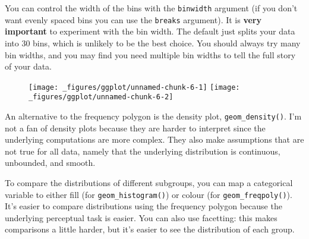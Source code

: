 You can control the width of the bins with the \texttt{binwidth}
argument (if you don't want evenly spaced bins you can use the
\texttt{breaks} argument). It is \textbf{very important} to experiment
with the bin width. The default just splits your data into 30 bins,
which is unlikely to be the best choice. You should always try many bin
widths, and you may find you need multiple bin widths to tell the full
story of your data.

\begin{Shaded}
\begin{Highlighting}[]
\OperatorTok{+}\StringTok{ }
\StringTok{  }\NormalTok{(} \NormalTok{)}
\OperatorTok{+}\StringTok{ }
\StringTok{  }\NormalTok{(} \NormalTok{)}
\end{Highlighting}
\end{Shaded}

\begin{figure}[H]
  \texttt{[image: \_figures/ggplot/unnamed-chunk-6-1]}%
  \texttt{[image: \_figures/ggplot/unnamed-chunk-6-2]}
\end{figure}

An alternative to the frequency polygon is the density plot,
\texttt{geom\_density()}. I'm not a fan of density plots because they
are harder to interpret since the underlying computations are more
complex. They also make assumptions that are not true for all data,
namely that the underlying distribution is continuous, unbounded, and
smooth.

To compare the distributions of different subgroups, you can map a
categorical variable to either fill (for \texttt{geom\_histogram()}) or
colour (for \texttt{geom\_freqpoly()}). It's easier to compare
distributions using the frequency polygon because the underlying
perceptual task is easier. You can also use facetting: this makes
comparisons a little harder, but it's easier to see the distribution of
each group.

\begin{Shaded}
\begin{Highlighting}[]
\OperatorTok{+}\StringTok{ }
\StringTok{  }\NormalTok{(} \NormalTok{)}
\OperatorTok{+}\StringTok{ }
\StringTok{  }\NormalTok{(} \NormalTok{) }\OperatorTok{+}\StringTok{ }
\StringTok{  }\NormalTok{(}\OperatorTok{~} \NormalTok{)}
\end{Highlighting}
\end{Shaded}


